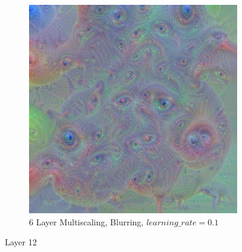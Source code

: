 \begin{figure}
\begin{subfigure}[t]{0.31\textwidth}
    \end{subfigure}
    \begin{subfigure}[t]{0.31\textwidth}
        \captionsetup{justification=centering}
        \centering
        \includegraphics[width=.7\linewidth]{figuras/feat_vis/experiments/layers/final/l12/random_image_pl6_lr1e-1_layer26.png}
        \caption{6 Layer Multiscaling, Blurring, \(learning\_rate = 0.1\)}
    \end{subfigure}

    \caption{Layer 12}
    \label{fig:layer_12}
\end{figure}

